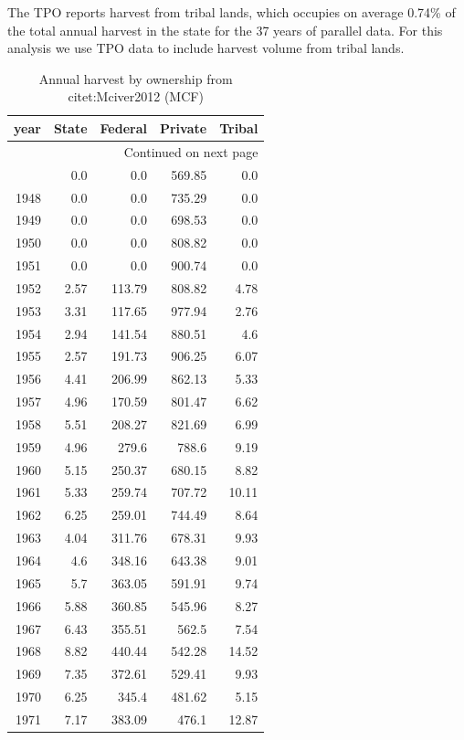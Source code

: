 \documentclass[a4paper]{article}
\begin{document}
The TPO reports harvest from tribal lands, which occupies on average 0.74\% of the total
annual harvest in the state for the 37 years of parallel data. For
this analysis we use TPO data to include harvest volume from tribal lands. 


\begin{longtable}{rrrrr}
\caption{Annual harvest by ownership from citet:Mciver2012 (MCF)}
\\
year & State & Federal & Private & Tribal\\
\hline
\endhead
\hline\multicolumn{5}{r}{Continued on next page} \\
\endfoot
\endlastfoot
1947 & 0.0 & 0.0 & 569.85 & 0.0\\
1948 & 0.0 & 0.0 & 735.29 & 0.0\\
1949 & 0.0 & 0.0 & 698.53 & 0.0\\
1950 & 0.0 & 0.0 & 808.82 & 0.0\\
1951 & 0.0 & 0.0 & 900.74 & 0.0\\
1952 & 2.57 & 113.79 & 808.82 & 4.78\\
1953 & 3.31 & 117.65 & 977.94 & 2.76\\
1954 & 2.94 & 141.54 & 880.51 & 4.6\\
1955 & 2.57 & 191.73 & 906.25 & 6.07\\
1956 & 4.41 & 206.99 & 862.13 & 5.33\\
1957 & 4.96 & 170.59 & 801.47 & 6.62\\
1958 & 5.51 & 208.27 & 821.69 & 6.99\\
1959 & 4.96 & 279.6 & 788.6 & 9.19\\
1960 & 5.15 & 250.37 & 680.15 & 8.82\\
1961 & 5.33 & 259.74 & 707.72 & 10.11\\
1962 & 6.25 & 259.01 & 744.49 & 8.64\\
1963 & 4.04 & 311.76 & 678.31 & 9.93\\
1964 & 4.6 & 348.16 & 643.38 & 9.01\\
1965 & 5.7 & 363.05 & 591.91 & 9.74\\
1966 & 5.88 & 360.85 & 545.96 & 8.27\\
1967 & 6.43 & 355.51 & 562.5 & 7.54\\
1968 & 8.82 & 440.44 & 542.28 & 14.52\\
1969 & 7.35 & 372.61 & 529.41 & 9.93\\
1970 & 6.25 & 345.4 & 481.62 & 5.15\\
1971 & 7.17 & 383.09 & 476.1 & 12.87\\

\end{longtable}
\end{document}
